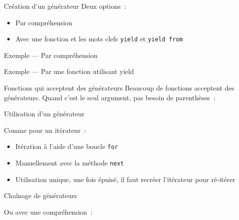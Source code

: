 \begin{frame}{Création d'un générateur}
  Deux options~:

  \begin{itemize}[<+->]
    \item Par compréhension
    \item Avec une fonction et les mots clefs \texttt{yield} et \texttt{yield from}
  \end{itemize}
\end{frame}

\begin{frame}{Exemple --- Par compréhension}
\end{frame}

\begin{frame}{Exemple --- Par une fonction utilisant yield}
\end{frame}

\begin{frame}{Fonctions qui acceptent des générateurs}
  Beaucoup de fonctions acceptent des générateurs. Quand c'est le seul argument, pas besoin de parenthèses~:

\end{frame}

\begin{frame}{Utilisation d'un générateur}

  Comme pour un itérateur~:

  \begin{itemize}[<+->]
    \item Itération à l'aide d'une boucle \texttt{for} 
    \item Manuellement avec la méthode \texttt{next} 
    \item \alert{Utilisation unique}, une fois épuisé, il faut recréer l'itérateur pour ré-itérer
  \end{itemize}
\end{frame}

\begin{frame}{Chaînage de générateurs}

  Ou avec une compréhension~:

\end{frame}

